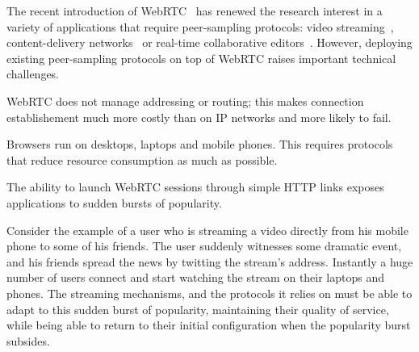 The recent introduction of WebRTC~\cite{webrtc} has renewed the
research interest in a variety of applications that require
peer-sampling protocols: video streaming~\cite{hivejs,smoothcache2},
content-delivery networks~\cite{Zhang:2013:MBC:2465351.2465379} or
real-time collaborative editors~\cite{nedelec2016crate}. However,
deploying existing peer-sampling protocols on top of WebRTC raises
important technical challenges.
\begin{inparaenum}[(1)]
\item WebRTC does not manage addressing or routing; this makes
  connection establishement much more costly than on IP networks and
  more likely to fail. 
\item Browsers run on desktops, laptops and mobile phones. This
  requires protocols that reduce resource consumption as much as
  possible.
\item The ability to launch WebRTC sessions through simple HTTP links
  exposes applications to sudden bursts of popularity.  %
\end{inparaenum}
Consider the example of a user who is streaming a video directly from
his mobile phone to some of his friends. The user suddenly witnesses
some dramatic event, and his friends spread the news by twitting the
stream's address. Instantly a huge number of users connect and start
watching the stream on their laptops and phones. The streaming
mechanisms, and the protocols it relies on must be able to adapt to
this sudden burst of popularity, maintaining their quality of service,
while being able to return to their initial configuration when the
popularity burst subsides. 


